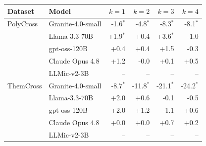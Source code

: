 \begin{tabular}{llrrrr}
\toprule
Dataset & Model & $k{=}1$ & $k{=}2$ & $k{=}3$ & $k{=}4$ \\
\midrule
PolyCross & Granite-4.0-small & -1.6$^{*}$ & -4.8$^{*}$ & -8.3$^{*}$ & -8.1$^{*}$ \\
 & Llama-3.3-70B & +1.9$^{*}$ & +0.4 & +3.6$^{*}$ & -1.0 \\
 & gpt-oss-120B & +0.4 & +0.4 & +1.5 & -0.3 \\
 & Claude Opus 4.8 & +1.2 & -0.0 & +0.1 & +0.5 \\
 & LLMic-v2-3B & -- & -- & -- & -- \\
\midrule
ThemCross & Granite-4.0-small & -8.7$^{*}$ & -11.8$^{*}$ & -21.1$^{*}$ & -24.2$^{*}$ \\
 & Llama-3.3-70B & +2.0 & +0.6 & -0.1 & -0.5 \\
 & gpt-oss-120B & +2.0 & +1.2 & -1.1 & +0.6 \\
 & Claude Opus 4.8 & +0.0 & +0.0 & +0.7 & +0.2 \\
 & LLMic-v2-3B & -- & -- & -- & -- \\
\bottomrule
\end{tabular}
